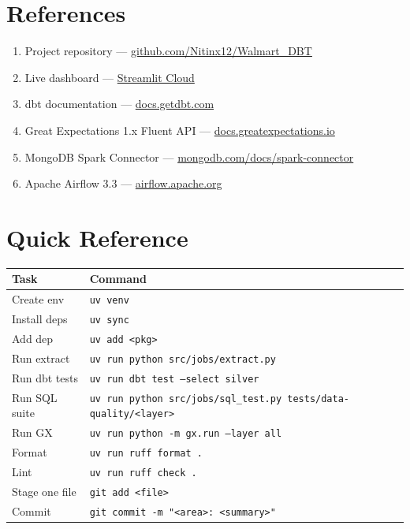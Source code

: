 \documentclass[11pt,a4paper]{article}
\begin{document}
\section*{References}
\begin{enumerate}[leftmargin=1.6em,itemsep=2pt]
  \item Project repository — \href{https://github.com/Nitinx12/Walmart_DBT}{github.com/Nitinx12/Walmart\_DBT}
  \item Live dashboard — \href{https://walmartdbt-b3fdfqwyky3ghzr5syyxtu.streamlit.app/}{Streamlit Cloud}
  \item dbt documentation — \href{https://docs.getdbt.com}{docs.getdbt.com}
  \item Great Expectations 1.x Fluent API — \href{https://docs.greatexpectations.io}{docs.greatexpectations.io}
  \item MongoDB Spark Connector — \href{https://www.mongodb.com/docs/spark-connector/}{mongodb.com/docs/spark-connector}
  \item Apache Airflow 3.3 — \href{https://airflow.apache.org/docs/apache-airflow/3.3.0/}{airflow.apache.org}
\end{enumerate}

\appendix
\section{Quick Reference}

\begin{center}
\begin{longtable}{l l}
\toprule
Task & Command \\
\midrule
\endhead
Create env & \texttt{uv venv} \\
Install deps & \texttt{uv sync} \\
Add dep & \texttt{uv add <pkg>} \\
Run extract & \texttt{uv run python src/jobs/extract.py} \\
Run dbt tests & \texttt{uv run dbt test --select silver} \\
Run SQL suite & \texttt{uv run python src/jobs/sql\_test.py tests/data-quality/<layer>} \\
Run GX & \texttt{uv run python -m gx.run --layer all} \\
Format & \texttt{uv run ruff format .} \\
Lint & \texttt{uv run ruff check .} \\
Stage one file & \texttt{git add <file>} \\
Commit & \texttt{git commit -m "<area>: <summary>"} \\
\bottomrule
\end{longtable}
\end{center}
\end{document}
